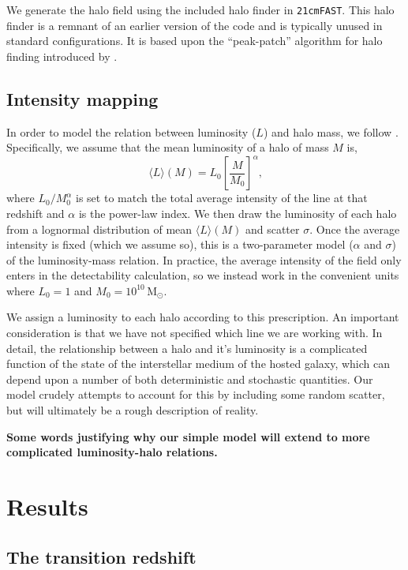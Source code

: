 \documentclass[a4paper,fleqn,usenatbib]{mnras}
\newcommand{\beq}{\begin{equation}}
\newcommand{\eeq}{\end{equation}}
\newcommand{\tfast}{\texttt{21cmFAST}}
\newcommand{\avg}[1]{\ensuremath{\langle #1 \rangle}}
\newcommand{\Msun}{\ensuremath{\text{M}_\odot}}
\begin{document}
We generate the halo field using the included halo finder in \tfast{}. This
halo finder is a remnant of an earlier version of the code
\citep{2007ApJ...669..663M} and is typically unused in standard
configurations. It is based upon the ``peak-patch'' algorithm for halo finding
introduced by \citet{1996ApJS..103....1B}.

\subsection{Intensity mapping} \label{ssec:oiii_int_map}
In order to model the relation between luminosity ($L$) and
halo mass, we follow \citet{2019ApJ...874..133B}. Specifically, we assume that
the mean luminosity of a halo of mass $M$ is,
\beq \label{eq:lum_mass_relation}
\avg{L}(M) = L_0 \left[ \frac{M}{M_0} \right]^{\alpha}\text{,}
\eeq
where $L_0/M_0^{\alpha}$ is set to match the total average intensity of
the line at that redshift and $\alpha$ is the power-law index. We then draw the
luminosity of each halo from a lognormal distribution of mean $\avg{L}(M)$ and
scatter $\sigma$. Once the average intensity is fixed (which we assume so),
this is a two-parameter model ($\alpha$ and $\sigma$) of the
luminosity-mass relation. In practice, the average intensity of the field only
enters in the detectability calculation, so we instead work in the convenient
units where $L_0=1$ and $M_0=10^{10}\,\Msun$.

We assign a luminosity to each halo according to this prescription. An
important consideration is that we have not specified which line we are
working with. In detail, the relationship between a halo and it's luminosity
is a complicated function of the state of the interstellar medium of the
hosted galaxy, which can depend upon a number of both deterministic and
stochastic quantities. Our model crudely attempts to account for this by
including some random scatter, but will ultimately be a rough description of
reality.

{\bf Some words justifying why our simple model will extend to more
complicated luminosity-halo relations.}

\section{Results} \label{sec:results}
\subsection{The transition redshift} \label{ssec:ztran_results}
\end{document}
